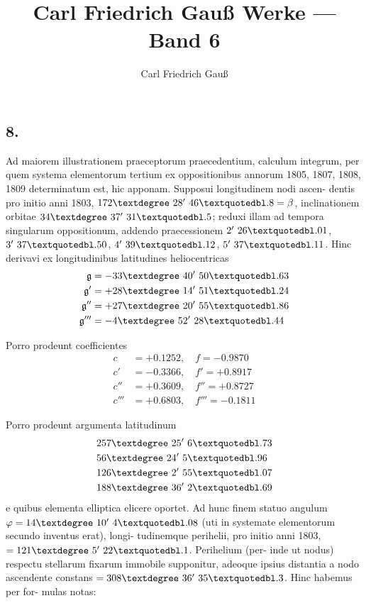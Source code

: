 \documentclass[12pt,a4paper]{article}
\title{Carl Friedrich Gau\ss{} Werke --- Band 6}
\author{Carl Friedrich Gau\ss{}}
\date{}
\begin{document}
\maketitle
\thispagestyle{empty}

\subsection*{8.}

Ad maiorem illustrationem praeceptorum praecedentium, calculum integrum,
per quem systema elementorum tertium ex oppositionibus annorum 1805, 1807,
1808, 1809 determinatum est, hic apponam. Supposui longitudinem nodi ascen-
dentis pro initio anni 1803, $172\textdegree\ 28'\ 46\textquotedbl.8 = \beta$, inclinationem orbitae $34\textdegree\ 37'\ 31\textquotedbl.5$;
reduxi illam ad tempora singularum oppositionum, addendo praecessionem
$2'\ 26\textquotedbl.01$, $3'\ 37\textquotedbl.50$, $4'\ 39\textquotedbl.12$, $5'\ 37\textquotedbl.11$. Hinc derivavi ex longitudinibus
latitudines heliocentricas
\begin{align*}
\mathfrak{g} &= -33\textdegree\ 40'\ 50\textquotedbl.63 \\
\mathfrak{g}' &= +28\textdegree\ 14'\ 51\textquotedbl.24 \\
\mathfrak{g}'' &= +27\textdegree\ 20'\ 55\textquotedbl.86 \\
\mathfrak{g}''' &= -4\textdegree\ 52'\ 28\textquotedbl.44
\end{align*}

Porro prodeunt coefficientes
\begin{align*}
c &= +0.1252, \quad f = -0.9870 \\
c' &= -0.3366, \quad f' = +0.8917 \\
c'' &= +0.3609, \quad f'' = +0.8727 \\
c''' &= +0.6803, \quad f''' = -0.1811
\end{align*}

Porro prodeunt argumenta latitudinum
\begin{align*}
&257\textdegree\ 25'\ 6\textquotedbl.73 \\
&56\textdegree\ 24'\ 5\textquotedbl.96 \\
&126\textdegree\ 2'\ 55\textquotedbl.07 \\
&188\textdegree\ 36'\ 2\textquotedbl.69
\end{align*}
e quibus elementa elliptica elicere oportet. Ad hunc finem statuo angulum
$\varphi = 14\textdegree\ 10'\ 4\textquotedbl.08$ (uti in systemate elementorum secundo inventus erat), longi-
tudinemque perihelii, pro initio anni 1803, $= 121\textdegree\ 5'\ 22\textquotedbl.1$. Perihelium (per-
inde ut nodus) respectu stellarum fixarum immobile supponitur, adeoque ipsius
distantia a nodo ascendente constans $= 308\textdegree\ 36'\ 35\textquotedbl.3$. Hinc habemus per for-
mulas notas:
\end{document}
